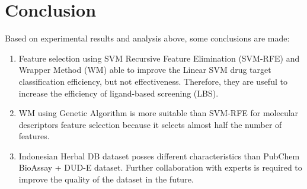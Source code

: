 \documentclass[conference,compsoc,12pt]{IEEEtran}
\begin{document}
	\section{Conclusion}
	
	Based on experimental results and analysis above, some conclusions are made:
	
	\begin{enumerate}
		\item Feature selection using SVM Recursive Feature Elimination (SVM-RFE) and Wrapper Method (WM) able to improve the Linear SVM drug target classification efficiency, but not effectiveness. Therefore, they are useful to increase the efficiency of ligand-based screening (LBS).
		\item WM using Genetic Algorithm is more suitable than SVM-RFE for molecular descriptors feature selection because it selects almost half the number of features.
		\item Indonesian Herbal DB dataset posses different characteristics than PubChem BioAssay + DUD-E dataset. Further collaboration with experts is required to improve the quality of the dataset in the future.
	\end{enumerate}
	
	
	
	
	
	
\end{document}

